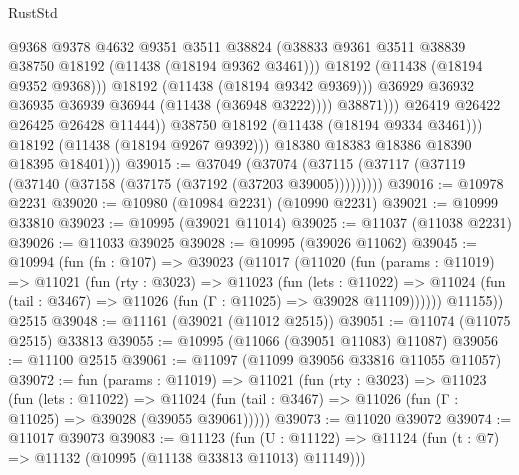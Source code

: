 \begin{lexlean}{RustStd}
\begin{coremodule}
                                @9368
                                @9378
                                @4632
                                @9351
                                @3511
                                @38824
                                (@38833
                                  @9361
                                  @3511
                                  @38839
                                  @38750
                                  @18192
                                  (@11438 (@18194 @9362 @3461)))
                                @18192
                                (@11438 (@18194 @9352 @9368)))
                              @18192
                              (@11438 (@18194 @9342 @9369)))
                            @36929
                            @36932
                            @36935
                            @36939
                            @36944
                            (@11438 (@36948 @3222))))
                        @38871)))
                  @26419
                  @26422
                  @26425
                  @26428
                  @11444))
              @38750
              @18192
              (@11438 (@18194 @9334 @3461)))
            @18192
            (@11438 (@18194 @9267 @9392)))
          @18380
          @18383
          @18386
          @18390
          @18395
          @18401)))
@39015 := @37049
    (@37074 (@37115 (@37117 (@37119 (@37140 (@37158 (@37175 (@37192 (@37203 @39005)))))))))
@39016 := @10978 @2231
@39020 := @10980 (@10984 @2231) (@10990 @2231)
@39021 := @10999 @33810
@39023 := @10995 (@39021 @11014)
@39025 := @11037 (@11038 @2231)
@39026 := @11033 @39025
@39028 := @10995 (@39026 @11062)
@39045 := @10994
    (fun (fn : @107) =>
    @39023
      (@11017
        (@11020
          (fun (params : @11019) =>
          @11021
            (fun (rty : @3023) =>
            @11023
              (fun (lets : @11022) =>
              @11024 (fun (tail : @3467) => @11026 (fun (Γ : @11025) => @39028 @11109))))))
        @11155))
    @2515
@39048 := @11161 (@39021 (@11012 @2515))
@39051 := @11074 (@11075 @2515) @33813
@39055 := @10995 (@11066 (@39051 @11083) @11087)
@39056 := @11100 @2515
@39061 := @11097 (@11099 @39056 @33816 @11055 @11057)
@39072 := fun (params : @11019) =>
  @11021
    (fun (rty : @3023) =>
    @11023
      (fun (lets : @11022) =>
      @11024 (fun (tail : @3467) => @11026 (fun (Γ : @11025) => @39028 (@39055 @39061)))))
@39073 := @11020 @39072
@39074 := @11017 @39073
@39083 := @11123
    (fun (U : @11122) => @11124 (fun (t : @7) => @11132 (@10995 (@11138 @33813 @11013) @11149)))

\end{coremodule}
\end{lexlean}
